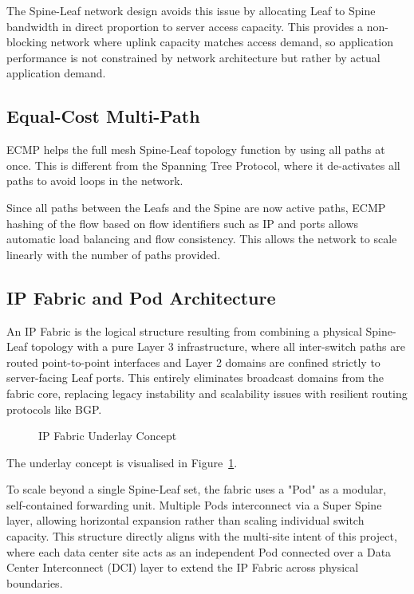The Spine-Leaf network design avoids this issue by allocating Leaf to Spine bandwidth in direct proportion to server access capacity\cite{Non_Blocking_Data_Center_Fabric_Design}. This provides a non-blocking network where uplink capacity matches access demand, so application performance is not constrained by network architecture but rather by actual application demand.

\subsection*{Equal-Cost Multi-Path}
ECMP helps the full mesh Spine-Leaf topology function by using all paths at once\cite{IETFRFC2992}. This is different from the Spanning Tree Protocol, where it de-activates all paths to avoid loops in the network\cite{Understand_and_Manage_ECMP_Scale_in_Cisco_ACI_White_Paper}.

Since all paths between the Leafs and the Spine are now active paths, ECMP hashing of the flow based on flow identifiers such as IP and ports allows automatic load balancing and flow consistency\cite{Hashing_Algorithms_for_LAG_and_ECMP}. This allows the network to scale linearly with the number of paths provided.

\subsection{IP Fabric and Pod Architecture}
An IP Fabric is the logical structure resulting from combining a physical Spine-Leaf topology with a pure Layer 3 infrastructure, where all inter-switch paths are routed point-to-point interfaces and Layer 2 domains are confined strictly to server-facing Leaf ports\cite{IP_Fabric_for_Media_Design_Guide}. This entirely eliminates broadcast domains from the fabric core, replacing legacy instability and scalability issues with resilient routing protocols like BGP.

\begin{figure}[!htbp]
\centering
\overlayunderlay
\caption{ IP Fabric Underlay Concept}
\label{fig:ip-fabric-underlay}
\end{figure}
The underlay concept is visualised in Figure~\ref{fig:ip-fabric-underlay}.

To scale beyond a single Spine-Leaf set, the fabric uses a "Pod" as a modular, self-contained forwarding unit\cite{Facebook_Data_Center_Network_Architecture}. Multiple Pods interconnect via a Super Spine layer, allowing horizontal expansion rather than scaling individual switch capacity. This structure directly aligns with the multi-site intent of this project, where each data center site acts as an independent Pod connected over a Data Center Interconnect (DCI) layer to extend the IP Fabric across physical boundaries\cite{IETFRFC8365}.


